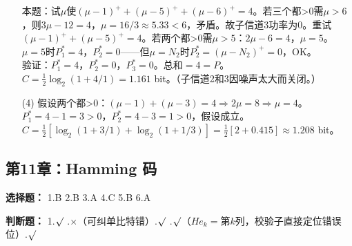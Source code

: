 \documentclass[12pt,a4paper]{ctexart}
\begin{document}
\begin{enumerate}[leftmargin=*]
本题：试$\mu$使$(\mu-1)^++(\mu-5)^++(\mu-6)^+=4$。若三个都>0需$\mu>6$，则$3\mu-12=4$，$\mu=16/3\approx5.33<6$，矛盾。故子信道3功率为0。重试$(\mu-1)^++(\mu-5)^+=4$。若两个都>0需$\mu>5$：$2\mu-6=4$，$\mu=5$。$\mu=5$时$P_1^*=4$，$P_2^*=0$——但$\mu=N_2$时$P_2^*=(\mu-N_2)^+=0$，OK。\\
验证：$P_1^*=4$，$P_2^*=0$，$P_3^*=0$。总和$=4=P$。\\
$C=\frac12\log_2(1+4/1)=1.161$ bit。（子信道2和3因噪声太大而关闭。）

\item[(4)] 假设两个都>0：$(\mu-1)+(\mu-3)=4 \Rightarrow 2\mu=8 \Rightarrow \mu=4$。\\
$P_1^*=4-1=3>0$，$P_2^*=4-3=1>0$，假设成立。\\
$C=\frac12[\log_2(1+3/1)+\log_2(1+1/3)]=\frac12[2+0.415]\approx1.208$ bit。
\end{enumerate}

\subsection*{第11章：Hamming 码}

\textbf{选择题：} 1.B \quad 2.B \quad 3.A \quad 4.C \quad 5.B \quad 6.A

\textbf{判断题：} 1.$\surd$ .$\times$（可纠单比特错）.$\surd$ .$\surd$（$He_k=\text{第}k\text{列}$，校验子直接定位错误位）.$\surd$
\end{document}
